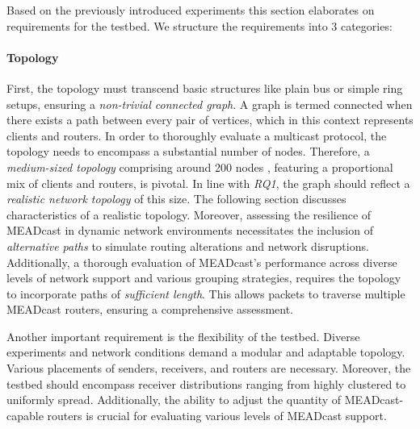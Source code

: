 
\label{sub:Requirements}
Based on the previously introduced experiments this section elaborates on 
    requirements for the testbed.
We structure the requirements into 3 categories:

\paragraph{Topology} %
\label{par:Topology}
First, the topology must transcend basic structures like plain bus or simple
    ring setups, ensuring a \textit{non-trivial connected graph}.
A graph is termed connected when there exists a path between every pair of
    vertices, which in this context represents clients and routers.
In order to thoroughly evaluate a multicast protocol, the topology needs to
    encompass a substantial number of nodes.
Therefore, a \textit{medium-sized topology} comprising around 200 nodes
    \cite{cisco_net_size},
    featuring a proportional mix of clients and routers, is pivotal.
In line with \textit{RQ1}, the graph should reflect a \textit{realistic
    network topology} of this size.
The following section discusses characteristics of a realistic topology.
Moreover, assessing the resilience of MEADcast in dynamic network environments
    necessitates the inclusion of \textit{alternative paths} to simulate
    routing alterations and network disruptions.
Additionally, a thorough evaluation of MEADcast's performance across 
    diverse levels of network support and various grouping strategies, requires
    the topology to incorporate paths of \textit{sufficient length}.
This allows packets to traverse multiple MEADcast routers, ensuring a
    comprehensive assessment.

Another important requirement is the flexibility of the testbed.
Diverse experiments and network conditions demand a modular and adaptable
    topology.
Various placements of senders, receivers, and routers are necessary.
Moreover, the testbed should encompass receiver distributions ranging from
    highly clustered to uniformly spread.
Additionally, the ability to adjust the quantity of MEADcast-capable routers is
    crucial for evaluating various levels of MEADcast support.

